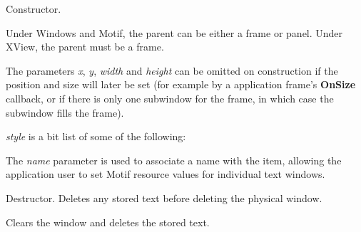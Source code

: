 
Constructor.

Under Windows and Motif, the parent can be either a frame or panel.
Under XView, the parent must be a frame.

The parameters {\it x}, {\it y}, {\it width} and {\it height} can be
omitted on construction if the position and size will later be set (for
example by a application frame's {\bf OnSize} callback, or if there is
only one subwindow for the frame, in which case the subwindow fills the
frame).

{\it style} is a bit list of some of the following:

\begin{twocollist}\itemsep=0pt
\end{twocollist}

The {\it name} parameter is used to associate a name with the item,
allowing the application user to set Motif resource values for
individual text windows.



Destructor.  Deletes any stored text before deleting the physical window.



Clears the window and deletes the stored text.



